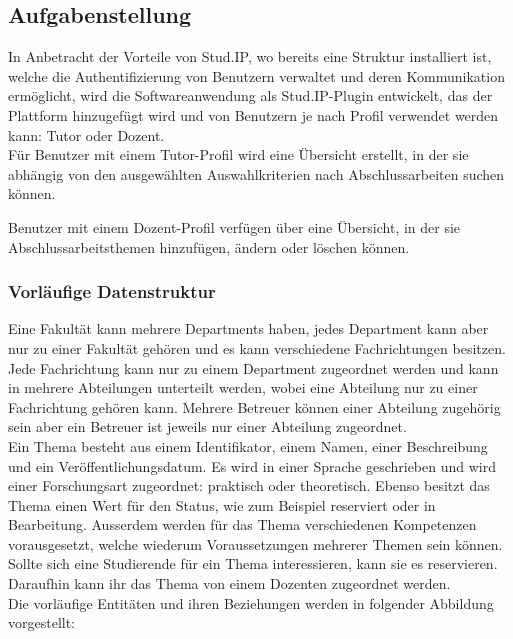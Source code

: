 \subsection{Aufgabenstellung}
In Anbetracht der Vorteile von Stud.IP, wo bereits eine Struktur installiert ist, welche die Authentifizierung von Benutzern verwaltet und deren Kommunikation ermöglicht, wird die Softwareanwendung als Stud.IP-Plugin entwickelt, das der Plattform hinzugefügt wird und von Benutzern je nach Profil verwendet werden kann: Tutor oder Dozent.\\

Für Benutzer mit einem Tutor-Profil wird eine Übersicht erstellt, in der sie abhängig von den ausgewählten Auswahlkriterien nach Abschlussarbeiten suchen können.

Benutzer mit einem Dozent-Profil verfügen über eine Übersicht, in der sie Abschlussarbeitsthemen hinzufügen, ändern oder löschen können.

\subsubsection{Vorläufige Datenstruktur}
Eine Fakultät kann mehrere Departments haben, jedes Department kann aber nur zu einer Fakultät gehören und es kann verschiedene Fachrichtungen besitzen.
Jede Fachrichtung kann nur zu einem Department zugeordnet werden und kann in mehrere Abteilungen unterteilt werden, wobei eine Abteilung nur zu einer Fachrichtung gehören kann.
Mehrere Betreuer können einer Abteilung zugehörig sein aber ein Betreuer ist jeweils nur einer Abteilung zugeordnet.\\

Ein Thema besteht aus einem Identifikator, einem Namen, einer Beschreibung und ein Veröffentlichungsdatum. Es wird in einer Sprache geschrieben und wird einer Forschungsart zugeordnet: praktisch oder theoretisch. Ebenso besitzt das Thema einen Wert für den Status, wie zum Beispiel reserviert oder in Bearbeitung. Au{ss}erdem werden für das Thema verschiedenen Kompetenzen vorausgesetzt, welche wiederum Voraussetzungen mehrerer Themen sein können.\\
Sollte sich eine Studierende für ein Thema interessieren, kann sie es reservieren. Daraufhin kann ihr das Thema von einem Dozenten zugeordnet werden.\\

Die vorläufige Entitäten und ihren Beziehungen werden in folgender Abbildung vorgestellt:\\


